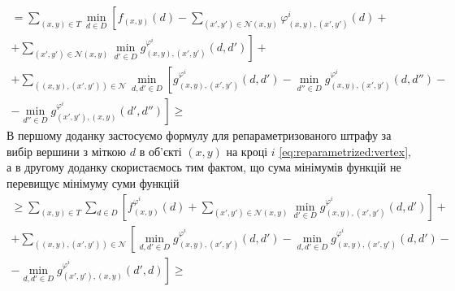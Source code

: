 \begin{equation*}
\begin{gathered}
    = \sum \limits_{\left(x, y \right) \in T}
        \min \limits_{d \in D} \left[
            f_{\left(x, y \right)} \left( d \right) -
            \sum \limits_{\left(x', y' \right) \in \mathcal{N} \left(x, y \right)}
                \varphi_{\left(x, y \right), \left(x', y' \right)}^i
                    \left(d \right) + \right. \\
                \left. + \sum \limits_{\left(x', y' \right) \in \mathcal{N} \left(x, y \right)}
                \min \limits_{d' \in D}
                    g_{\left(x, y \right), \left(x', y' \right)}^{\varphi^i}
                        \left(d, d' \right)
        \right] + \\
    + \sum \limits_{\left(\left(x, y \right), \left(x', y' \right)\right)\in\mathcal{N}}
        \min \limits_{d,d' \in D} \left[
            g_{\left(x, y \right), \left(x', y' \right)}^{\varphi^i}
                \left(d, d' \right) -
            \min \limits_{d'' \in D}
                g_{\left(x, y \right), \left(x', y' \right)}^{\varphi^i}
                    \left(d, d'' \right) - \right. \\
            \left. - \min \limits_{d'' \in D}
                g_{\left(x', y' \right), \left(x, y \right)}^{\varphi^i}
                    \left(d', d'' \right)
        \right] \ge
\end{gathered}
\end{equation*}
В першому доданку
застосуємо формулу для репараметризованого штрафу за вибір вершини з міткою $d$
в об'єкті $\left(x, y \right)$ на кроці $i$ \eqref{eq:reparametrized:vertex},
а в другому доданку скористаємось тим фактом,
що сума мінімумів функцій не перевищує мінімуму суми функцій
\begin{equation*}
\begin{gathered}
    \ge \sum \limits_{\left(x, y \right) \in T}
        \sum \limits_{d \in D} \left[
            f_{\left(x, y \right)}^{\varphi^i} \left(d \right) +
            \sum \limits_{\left(x', y' \right) \in \mathcal{N} \left(x, y \right)}
                \min \limits_{d' \in D}
                    g_{\left(x, y \right), \left(x', y' \right)}^{\varphi^i}
                        \left(d, d' \right)
        \right] + \\
    + \sum \limits_{\left(\left(x, y \right), \left(x', y' \right) \right)\in \mathcal{N}}
    \left[
        \min\limits_{d, d' \in D}
            g_{\left(x, y \right), \left(x', y' \right)}^{\varphi^i}
                \left(d, d' \right) -
        \min\limits_{d, d' \in D}
            g_{\left(x, y \right), \left(x', y' \right)}^{\varphi^i}
                \left(d, d' \right) - \right. \\
        \left. - \min\limits_{d, d' \in D}
            g_{\left(x', y' \right), \left(x, y \right)}^{\varphi^i}
                \left(d', d \right)
    \right] \ge
\end{gathered}
\end{equation*}

